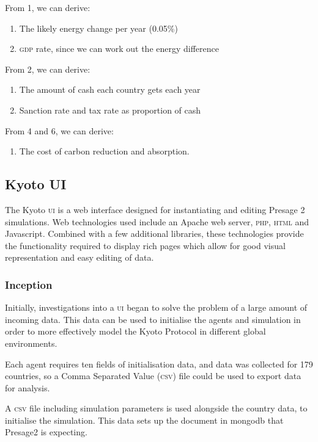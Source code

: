 From 1, we can derive: 

\begin{enumerate}[resume]
\item The likely energy change per year (0.05\%)
\item \textsc{gdp} rate, since we can work out the energy difference
\end{enumerate}

From 2, we can derive:

\begin{enumerate}[resume]
\item The amount of cash each country gets each year
\item Sanction rate and tax rate as proportion of cash
\end{enumerate}

From 4 and 6, we can derive:

\begin{enumerate}[resume]
\item The cost of carbon reduction and absorption.
\end{enumerate}

\subsection{Kyoto UI}

The Kyoto \textsc{ui} is a web interface designed for instantiating and editing Presage 2 simulations. Web technologies used include an Apache web server, \textsc{php}, \textsc{html} and Javascript. Combined with a few additional libraries, these technologies provide the functionality required to display rich pages which allow for good visual representation and easy editing of data.

\subsubsection{Inception}

Initially, investigations into a \textsc{ui} began to solve the problem of a large amount of incoming data. This data can be used to initialise the agents and simulation in order to more effectively model the Kyoto Protocol in different global environments.

Each agent requires ten fields of initialisation data, and data was collected for 179 countries, so a Comma Separated Value (\textsc{csv}) file could be used to export data for analysis.

A \textsc{csv} file including simulation parameters is used alongside the country data, to initialise the simulation. This data sets up the document in mongodb that Presage2 is expecting.

